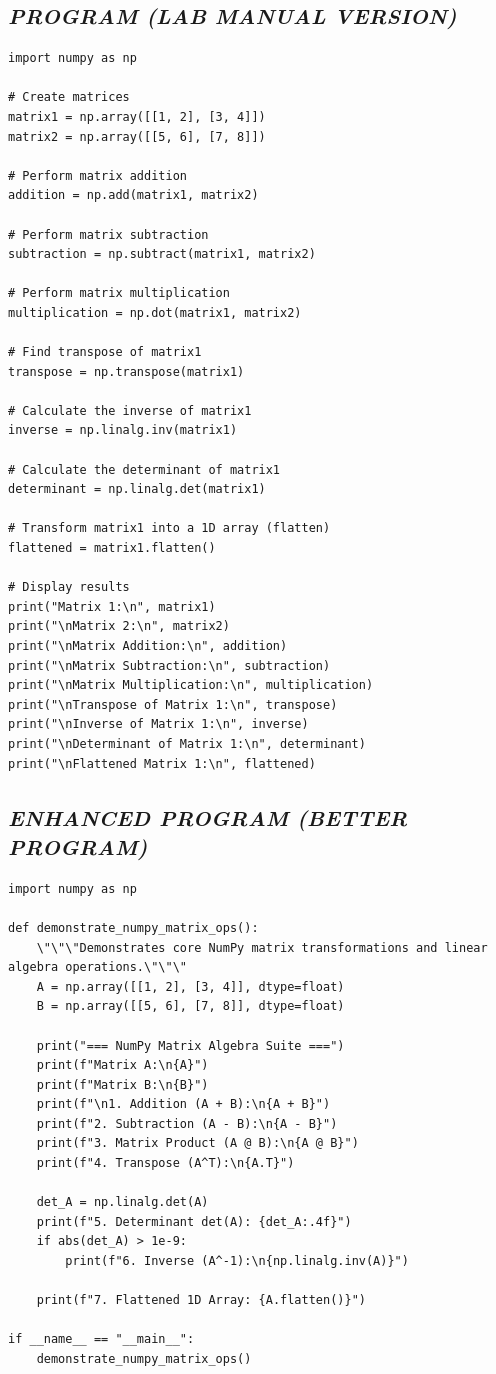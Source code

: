 \documentclass[11pt,a4paper]{article}
\begin{document}
\subsection*{\textit{PROGRAM (LAB MANUAL VERSION)}}
\begin{lstlisting}[style=pythonstyle]
import numpy as np 
 
# Create matrices 
matrix1 = np.array([[1, 2], [3, 4]]) 
matrix2 = np.array([[5, 6], [7, 8]]) 
 
# Perform matrix addition 
addition = np.add(matrix1, matrix2) 
 
# Perform matrix subtraction 
subtraction = np.subtract(matrix1, matrix2) 
 
# Perform matrix multiplication 
multiplication = np.dot(matrix1, matrix2) 
 
# Find transpose of matrix1 
transpose = np.transpose(matrix1) 
 
# Calculate the inverse of matrix1 
inverse = np.linalg.inv(matrix1) 
 
# Calculate the determinant of matrix1 
determinant = np.linalg.det(matrix1) 
 
# Transform matrix1 into a 1D array (flatten) 
flattened = matrix1.flatten() 
 
# Display results 
print("Matrix 1:\n", matrix1) 
print("\nMatrix 2:\n", matrix2) 
print("\nMatrix Addition:\n", addition) 
print("\nMatrix Subtraction:\n", subtraction) 
print("\nMatrix Multiplication:\n", multiplication) 
print("\nTranspose of Matrix 1:\n", transpose) 
print("\nInverse of Matrix 1:\n", inverse) 
print("\nDeterminant of Matrix 1:\n", determinant) 
print("\nFlattened Matrix 1:\n", flattened)
\end{lstlisting}

\subsection*{\textit{ENHANCED PROGRAM (BETTER PROGRAM)}}
\begin{lstlisting}[style=pythonstyle]
import numpy as np

def demonstrate_numpy_matrix_ops():
    \"\"\"Demonstrates core NumPy matrix transformations and linear algebra operations.\"\"\"
    A = np.array([[1, 2], [3, 4]], dtype=float)
    B = np.array([[5, 6], [7, 8]], dtype=float)

    print("=== NumPy Matrix Algebra Suite ===")
    print(f"Matrix A:\n{A}")
    print(f"Matrix B:\n{B}")
    print(f"\n1. Addition (A + B):\n{A + B}")
    print(f"2. Subtraction (A - B):\n{A - B}")
    print(f"3. Matrix Product (A @ B):\n{A @ B}")
    print(f"4. Transpose (A^T):\n{A.T}")
    
    det_A = np.linalg.det(A)
    print(f"5. Determinant det(A): {det_A:.4f}")
    if abs(det_A) > 1e-9:
        print(f"6. Inverse (A^-1):\n{np.linalg.inv(A)}")
    
    print(f"7. Flattened 1D Array: {A.flatten()}")

if __name__ == "__main__":
    demonstrate_numpy_matrix_ops()
\end{lstlisting}
\end{document}
